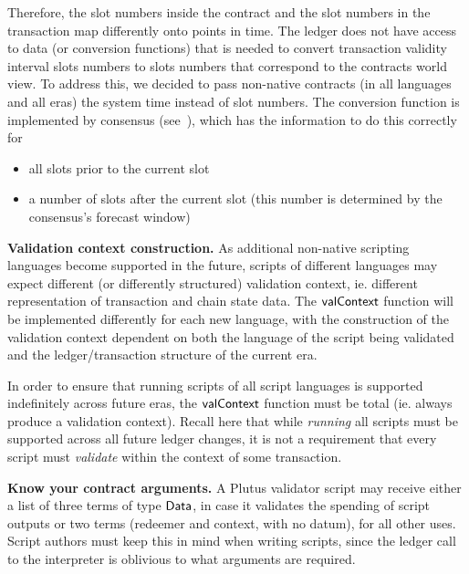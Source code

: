 Therefore, the slot numbers inside the contract and the slot numbers in the transaction
map differently onto points in time. The ledger does not have access to data (or conversion functions)
that is needed to convert transaction validity interval slots numbers to slots numbers
that correspond to the contracts world view. To address this, we decided to pass
non-native contracts (in all languages and all eras) the system time instead of slot numbers.
The conversion function is implemented by consensus (see~\cite{shelley_consensus}),
which has the information to do this correctly for

\begin{itemize}
  \item all slots prior to the current slot
  \item a number of slots after the current slot (this number is determined by
  the consensus's forecast window)
\end{itemize}

\textbf{Validation context construction.}
  As additional non-native scripting languages become supported in the future, scripts of different
  languages may expect different (or differently structured) validation context, ie. different
  representation of transaction and chain state data.
  The $\mathsf{valContext}$ function will be implemented differently
  for each new language, with the construction of the validation context
  dependent on both the language of the script being validated and the ledger/transaction structure
  of the current era.

  In order to ensure that running scripts of all script languages is supported indefinitely across
  future eras, the $\mathsf{valContext}$ function must be total (ie. always produce
  a validation context). Recall here that while \emph{running} all scripts must be supported across
  all future ledger changes,
  it is not a requirement that every script must \emph{validate} within the context of some transaction. \newline

\textbf{Know your contract arguments.}
  A Plutus validator script may receive either a list of three terms of type $\mathsf{Data}$, in case it validates the spending of script outputs
  or two terms (redeemer and context, with no datum), for all other uses.
  Script authors must keep this in mind when writing scripts, since the ledger call to the interpreter is oblivious to what
  arguments are required.


